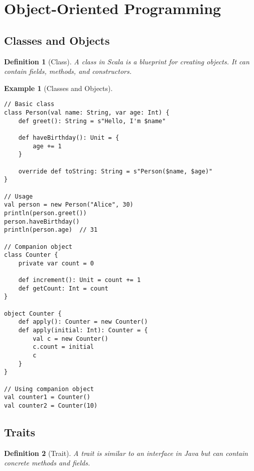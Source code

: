 \documentclass[11pt]{article}
\newtheorem{definition}{Definition}[section]
\newtheorem{example}{Example}[section]
\begin{document}
\section{Object-Oriented Programming}

\subsection{Classes and Objects}

\begin{definition}[Class]
A class in Scala is a blueprint for creating objects. It can contain fields, methods, and constructors.
\end{definition}

\begin{example}[Classes and Objects]
\begin{lstlisting}
// Basic class
class Person(val name: String, var age: Int) {
    def greet(): String = s"Hello, I'm $name"
    
    def haveBirthday(): Unit = {
        age += 1
    }
    
    override def toString: String = s"Person($name, $age)"
}

// Usage
val person = new Person("Alice", 30)
println(person.greet())
person.haveBirthday()
println(person.age)  // 31

// Companion object
class Counter {
    private var count = 0
    
    def increment(): Unit = count += 1
    def getCount: Int = count
}

object Counter {
    def apply(): Counter = new Counter()
    def apply(initial: Int): Counter = {
        val c = new Counter()
        c.count = initial
        c
    }
}

// Using companion object
val counter1 = Counter()
val counter2 = Counter(10)
\end{lstlisting}
\end{example}

\subsection{Traits}

\begin{definition}[Trait]
A trait is similar to an interface in Java but can contain concrete methods and fields.
\end{definition}
\end{document}

